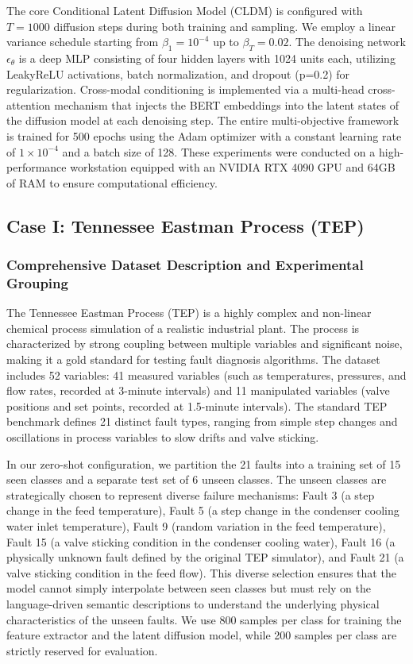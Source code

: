 The core Conditional Latent Diffusion Model (CLDM) is configured with $T=1000$ diffusion steps during both training and sampling. We employ a linear variance schedule starting from $\beta_1=10^{-4}$ up to $\beta_T=0.02$. The denoising network $\epsilon_\theta$ is a deep MLP consisting of four hidden layers with 1024 units each, utilizing LeakyReLU activations, batch normalization, and dropout (p=0.2) for regularization. Cross-modal conditioning is implemented via a multi-head cross-attention mechanism that injects the BERT embeddings into the latent states of the diffusion model at each denoising step. The entire multi-objective framework is trained for 500 epochs using the Adam optimizer with a constant learning rate of $1 \times 10^{-4}$ and a batch size of 128. These experiments were conducted on a high-performance workstation equipped with an NVIDIA RTX 4090 GPU and 64GB of RAM to ensure computational efficiency.

\subsection{Case I: Tennessee Eastman Process (TEP)}
\label{sec:case1}

\subsubsection{Comprehensive Dataset Description and Experimental Grouping}
The Tennessee Eastman Process (TEP) is a highly complex and non-linear chemical process simulation of a realistic industrial plant. The process is characterized by strong coupling between multiple variables and significant noise, making it a gold standard for testing fault diagnosis algorithms. The dataset includes 52 variables: 41 measured variables (such as temperatures, pressures, and flow rates, recorded at 3-minute intervals) and 11 manipulated variables (valve positions and set points, recorded at 1.5-minute intervals). The standard TEP benchmark defines 21 distinct fault types, ranging from simple step changes and oscillations in process variables to slow drifts and valve sticking.

In our zero-shot configuration, we partition the 21 faults into a training set of 15 seen classes and a separate test set of 6 unseen classes. The unseen classes are strategically chosen to represent diverse failure mechanisms: Fault 3 (a step change in the feed temperature), Fault 5 (a step change in the condenser cooling water inlet temperature), Fault 9 (random variation in the feed temperature), Fault 15 (a valve sticking condition in the condenser cooling water), Fault 16 (a physically unknown fault defined by the original TEP simulator), and Fault 21 (a valve sticking condition in the feed flow). This diverse selection ensures that the model cannot simply interpolate between seen classes but must rely on the language-driven semantic descriptions to understand the underlying physical characteristics of the unseen faults. We use 800 samples per class for training the feature extractor and the latent diffusion model, while 200 samples per class are strictly reserved for evaluation.

